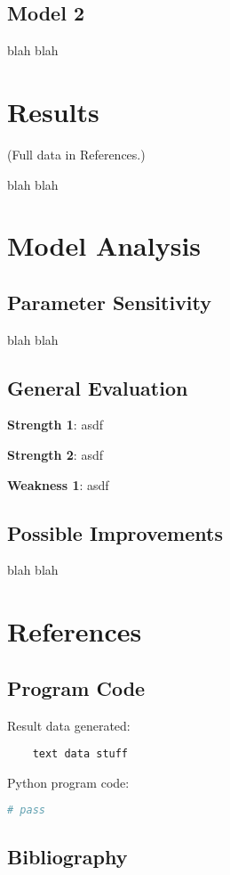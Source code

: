 \documentclass{mcmthesis}
\begin{document}
    \subsection{Model 2}
    blah blah


    \section{Results}
    \noindent (Full data in References.)

    blah blah


    \section{Model Analysis}

    \subsection{Parameter Sensitivity}
    blah blah

    \subsection{General Evaluation}

    \noindent\textbf{Strength 1}: asdf

    \noindent\textbf{Strength 2}: asdf

    \noindent\textbf{Weakness 1}: asdf

    \subsection{Possible Improvements}
    blah blah


    \newpage


    \section{References}

    \subsection{Program Code}
    \noindent Result data generated:
    \begin{verbatim}
    text data stuff

    \end{verbatim}

    \noindent Python program code:
    \begin{lstlisting}[language=Python]
        # pass

    \end{lstlisting}

    \subsection{Bibliography}
\end{document}
